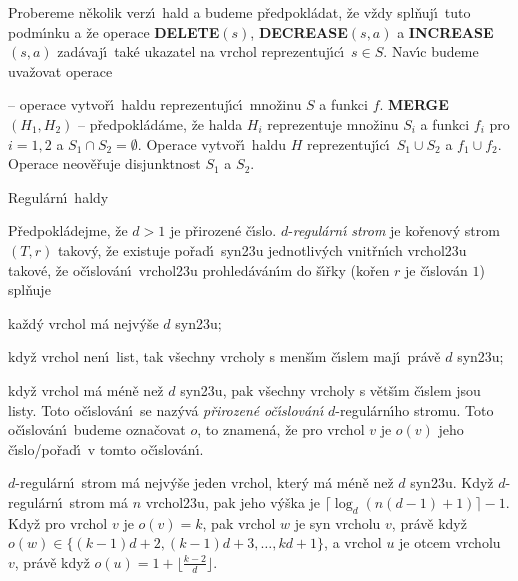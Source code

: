 \flushpar Probereme n\v ekolik verz\'\i\ hald a budeme 
p\v redpokl\'adat, \v ze v\v zdy spl\v nuj\'\i\ tuto podm\'\i nku a \v ze operace 
{\bf DELETE$(s)$}, {\bf DECREA\-SE$(s,a)$} a {\bf INCREASE$(s,a)$} zad\'avaj\'\i\ 
tak\'e ukazatel na vrchol repre\-zentuj\'\i c\'\i\ $s\in S$.  Nav\'\i c budeme 
uva\v zovat operace
\medskip

 -- operace vytvo\v r\'\i\ haldu 
reprezentuj\'\i c\'\i\ mno\v zinu $S$ a funkci $f$.\newline 
{\bf MERGE$(H_1,H_2)$} -- p\v redpokl\'ad\'ame, \v ze halda $H_i$ reprezentuje 
mno\v zinu $S_i$ a funkci $f_i$ pro $i=1,2$ a $S_1\cap S_2=\emptyset$. Operace 
vytvo\v r\'\i\ haldu $H$ reprezentuj\'\i c\'\i\ $S_1\cup S_2$ a $
f_1\cup f_2$. 
Operace neov\v e\v ruje disjunktnost $S_1$ a $S_2$.
\medskip

\heading
Regul\'arn\'\i\ haldy
\endheading

\flushpar P\v redpokl\'adejme, \v ze $d>1$ je p\v rirozen\'e \v c\'\i slo. 
$d$-\emph{regul\'arn\'\i} \emph{strom} je ko\v renov\'y strom 
$(T,r)$ takov\'y, \v ze existuje po\v rad\'\i\ syn\accent23u 
jednotliv\'ych vnit\v rn\'\i ch vrchol\accent23u takov\'e, \v ze 
o\v c\'\i slov\'an\'\i\ vrchol\accent23u pro\-hle\-d\'a\-v\'an\'\i m do \v s\'\i\v rky 
(ko\v ren $r$ je \v c\'\i slov\'an $1$) spl\v nuje 
\roster
\item
ka\v zd\'y vrchol m\'a nejv\'y\v se $d$ syn\accent23u;
\item
kdy\v z vrchol nen\'\i\ list, tak v\v sechny vrcholy s men\v s\'\i m 
\v c\'\i slem maj\'\i\ pr\'av\v e $d$ syn\accent23u;
\item
kdy\v z vrchol m\'a m\'en\v e ne\v z $d$ syn\accent23u, pak v\v sechny 
vrcholy s v\v et\v s\'\i m \v c\'\i slem jsou listy.
\endroster
Toto o\v c\'\i slov\'an\'\i\ se naz\'yv\'a \emph{p\v rirozen\'e} 
\emph{o\v c\'\i slov\'an\'\i} $d$-regul\'arn\'\i ho stromu. Toto o\v c\'\i slov\'an\'\i\ 
budeme ozna\v covat $o$, to znamen\'a, \v ze pro vrchol $v$ je $o
(v)$ jeho 
\v c\'\i slo/po\v rad\'\i\ v tomto o\v c\'\i slov\'an\'\i.


$d$-regul\'arn\'\i\ strom m\'a nejv\'y\v se jeden 
vrchol, kter\'y m\'a m\'en\v e ne\v z $d$ syn\accent23u. Kdy\v z 
$d$-regul\'arn\'\i\ strom m\'a $n$ vrchol\accent23u, pak jeho 
v\'y\v ska je $\lceil\log_d(n(d-1)+1)\rceil-1$. Kdy\v z pro vrchol 
$v$ je $o(v)=k$, pak vrchol $w$ je syn vrcholu $v$, pr\'av\v e 
kdy\v z $o(w)\in \{(k-1)d+2,(k-1)d+3,\dots,kd+1\}$, a vrchol $u$ je 
otcem vrcholu $v$, pr\'av\v e kdy\v z $o(u)=1+\lfloor\frac {k-2}d
\rfloor$. 
\endproclaim

